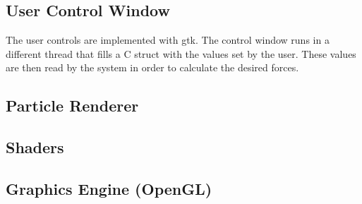 \documentclass[runningheads,a4paper]{llncs}
\begin{document}
\subsection{User Control Window}
The user controls are implemented with gtk. The control window runs in a different thread that fills a C struct with the values set by the user. These values are then read by the system in order to calculate the desired forces.

\subsection{Particle Renderer}

\subsection{Shaders}

\subsection{Graphics Engine (OpenGL)}

%







\end{document}

